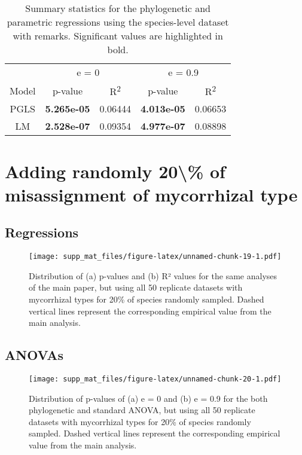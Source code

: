 \documentclass[]{article}
\begin{document}
\begin{table}[H]

\caption{\label{tab:unnamed-chunk-17}Summary statistics for the phylogenetic and parametric regressions using the species-level dataset with remarks. Significant values are highlighted in bold.}
\centering
\begin{tabular}{c|c|c|c|c}
\hline
\multicolumn{1}{c|}{ } & \multicolumn{2}{c|}{e = 0} & \multicolumn{2}{c}{e = 0.9} \\
\cline{2-3} \cline{4-5}
Model & p-value & R\textsuperscript{2} & p-value & R\textsuperscript{2}\\
\hline
PGLS & \textbf{5.265e-05} & 0.06444 & \textbf{4.013e-05} & 0.06653\\
\hline
LM & \textbf{2.528e-07} & 0.09354 & \textbf{4.977e-07} & 0.08898\\
\hline
\end{tabular}
\end{table}

\hypertarget{adding-randomly-20-of-misassignment-of-mycorrhizal-type}{%
\section{Adding randomly 20\textbackslash\% of misassignment of
mycorrhizal
type}\label{adding-randomly-20-of-misassignment-of-mycorrhizal-type}}

\hypertarget{regressions}{%
\subsection{Regressions}\label{regressions}}

\begin{figure}
\centering
\texttt{[image: supp\_mat\_files/figure-latex/unnamed-chunk-19-1.pdf]}
\caption{Distribution of (a) p-values and (b) R² values for the same
analyses of the main paper, but using all 50 replicate datasets with
mycorrhizal types for 20\% of species randomly sampled. Dashed vertical
lines represent the corresponding empirical value from the main
analysis.}
\end{figure}

\hypertarget{anovas}{%
\subsection{ANOVAs}\label{anovas}}

\begin{figure}
\centering
\texttt{[image: supp\_mat\_files/figure-latex/unnamed-chunk-20-1.pdf]}
\caption{Distribution of p-values of (a) e = 0 and (b) e = 0.9 for the
both phylogenetic and standard ANOVA, but using all 50 replicate
datasets with mycorrhizal types for 20\% of species randomly sampled.
Dashed vertical lines represent the corresponding empirical value from
the main analysis.}
\end{figure}
\end{document}
